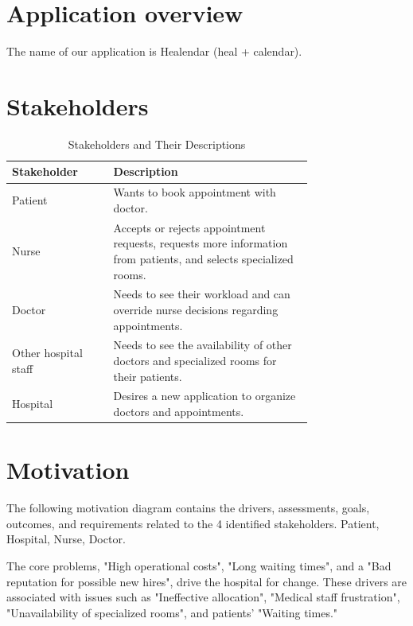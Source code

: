 \documentclass[11pt,english,a4paper,twoside]{article}
\title{\reporttitle}
\author{
        Lukáš Častven, Michal Kilian\\[2pt]
	{\small Slovenská technická univerzita v Bratislave}\\
	{\small Fakulta informatiky a informačných technológií}\\
	{\small \texttt{xcastven@stuba.sk, xkilian@stuba.sk}}
}
\date{\today}
\begin{document}
\maketitle

\section{Application overview}

The name of our application is Healendar (heal + calendar). 

\section{Stakeholders}

\begin{table}[h!]
  \centering
  \begin{tabular}{|p{0.25\linewidth}|p{0.5\linewidth}|}
    \hline
    \textbf{Stakeholder} & \textbf{Description} \\
    \hline
    Patient & Wants to book appointment with doctor. \\
    \hline
    Nurse & Accepts or rejects appointment requests,
    requests more information from patients, and selects
    specialized rooms. \\
    \hline
    Doctor & Needs to see their workload and can override
    nurse decisions regarding appointments. \\
    \hline
    Other hospital staff & Needs to see the availability of
    other doctors and specialized rooms for their patients. \\
    \hline
    Hospital & Desires a new application to organize
    doctors and appointments. \\
    \hline
  \end{tabular}
  \caption{Stakeholders and Their Descriptions}
  \label{tab:stakeholders}
\end{table}

\section{Motivation}

The following motivation diagram contains the drivers, assessments, goals,
outcomes, and requirements related to the 4 identified stakeholders.
Patient, Hospital, Nurse, Doctor.

The core problems, "High operational costs", "Long waiting times", and a "Bad
reputation for possible new hires", drive the hospital for change. These drivers
are associated with issues such as "Ineffective allocation", "Medical
staff frustration", "Unavailability of specialized rooms",
and patients' "Waiting times."
\end{document}
